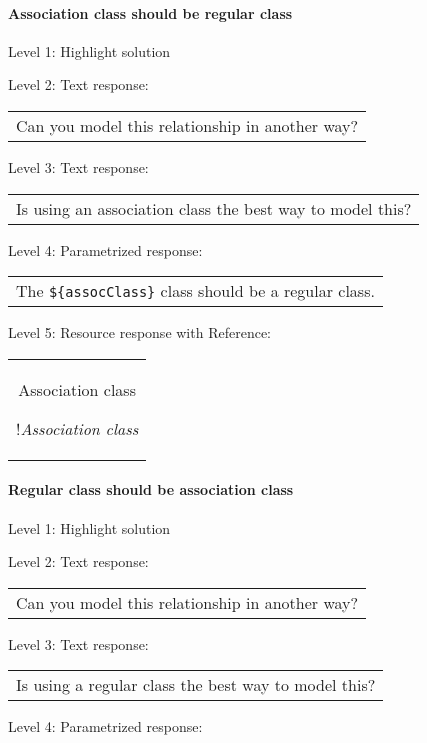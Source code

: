 \paragraph{Association class should be regular class}

\noindent Level 1: Highlight solution \medskip

\noindent Level 2: Text response: \medskip

\begin{tabular}{|c}
Can you model this relationship in another way?
\end{tabular} \medskip

\noindent Level 3: Text response: \medskip

\begin{tabular}{|c}
Is using an association class the best way to model this?
\end{tabular} \medskip

\noindent Level 4: Parametrized response: \medskip

\begin{tabular}{|c}
The \verb|${assocClass}| class should be a regular class.
\end{tabular} \medskip

\noindent Level 5: Resource response with Reference:

\begin{tabular}{|c}
Association class

!\textit{Association class}
\end{tabular} \medskip


\paragraph{Regular class should be association class}

\noindent Level 1: Highlight solution \medskip

\noindent Level 2: Text response: \medskip

\begin{tabular}{|c}
Can you model this relationship in another way?
\end{tabular} \medskip

\noindent Level 3: Text response: \medskip

\begin{tabular}{|c}
Is using a regular class the best way to model this?
\end{tabular} \medskip

\noindent Level 4: Parametrized response: \medskip

